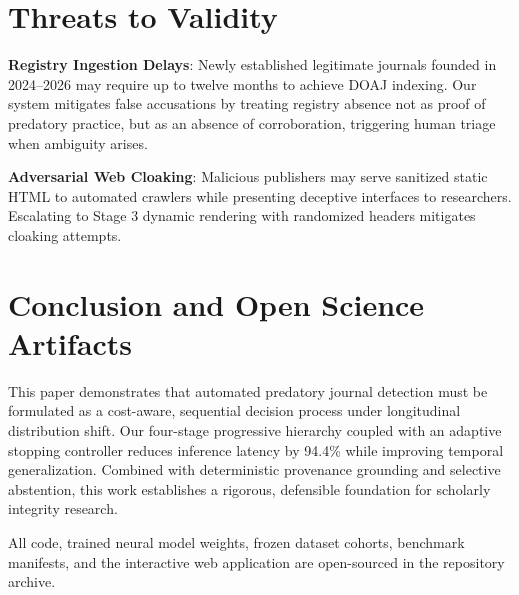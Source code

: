 \documentclass[journal]{IEEEtran}
\begin{document}
\section{Threats to Validity}
\textbf{Registry Ingestion Delays}: Newly established legitimate journals founded in 2024--2026 may require up to twelve months to achieve DOAJ indexing. Our system mitigates false accusations by treating registry absence not as proof of predatory practice, but as an absence of corroboration, triggering human triage when ambiguity arises.

\textbf{Adversarial Web Cloaking}: Malicious publishers may serve sanitized static HTML to automated crawlers while presenting deceptive interfaces to researchers. Escalating to Stage 3 dynamic rendering with randomized headers mitigates cloaking attempts.

\section{Conclusion and Open Science Artifacts}
This paper demonstrates that automated predatory journal detection must be formulated as a cost-aware, sequential decision process under longitudinal distribution shift. Our four-stage progressive hierarchy coupled with an adaptive stopping controller reduces inference latency by 94.4\% while improving temporal generalization. Combined with deterministic provenance grounding and selective abstention, this work establishes a rigorous, defensible foundation for scholarly integrity research.

All code, trained neural model weights, frozen dataset cohorts, benchmark manifests, and the interactive web application are open-sourced in the repository archive.
\end{document}

